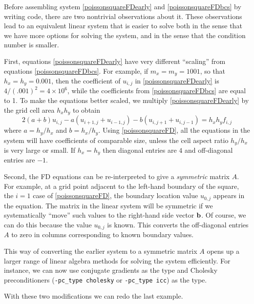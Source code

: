 \medskip
Before assembling system \eqref{poissonsquareFDearly} and \eqref{poissonsquareFDbcs} by writing \PETSc code, there are two nontrivial observations about it.  These observations lead to an equivalent linear system that is easier to solve both in the sense that we have more options for solving the system, and in the sense that the condition number is smaller.

First, equations \eqref{poissonsquareFDearly} have very different ``scaling'' from equations \eqref{poissonsquareFDbcs}.  For example, if $m_x=m_y=1001$, so that $h_x=h_y=0.001$, then the coefficient of $u_{i,j}$ in \eqref{poissonsquareFDearly} is $4/(.001)^2 = 4 \times 10^6$, while the coefficients from \eqref{poissonsquareFDbcs} are equal to 1.  To make the equations better scaled, we multiply \eqref{poissonsquareFDearly} by the grid cell area $h_x h_y$ to obtain
\begin{equation}
2 (a + b) u_{i,j} - a \left(u_{i+1,j} + u_{i-1,j}\right) - b \left(u_{i,j+1} + u_{i,j-1}\right) = h_x h_y f_{i,j} \label{poissonsquareFD}
\end{equation}
where $a=h_y/h_x$ and $b=h_x/h_y$.  Using \eqref{poissonsquareFD}, all the equations in the system will have coefficients of comparable size, unless the cell aspect ratio $h_y/h_x$ is very large or small.  If $h_x=h_y$ then diagonal entries are $4$ and off-diagonal entries are $-1$.

Second, the FD equations can be re-interpreted to give a \emph{symmetric} matrix $A$.  For example, at a grid point adjacent to the left-hand boundary of the square, the $i=1$ case of \eqref{poissonsquareFD}, the boundary location value $u_{0,j}$ appears in the equation.  The matrix in the linear system will be symmetric if we systematically ``move'' such values to the right-hand side vector $\mathbf{b}$.  Of course, we can do this because the value $u_{0,j}$ is known.  This converts the off-diagonal entries $A$ to zero in columns corresponding to known boundary values.

This way of converting the earlier system to a symmetric matrix $A$ opens up a larger range of linear algebra methods for solving the system efficiently.  For instance, we can now use conjugate gradients as the \pKSP type and Cholesky preconditioners (\texttt{-pc\_type cholesky} or \texttt{-pc\_type icc}) as the \pPC type.

With these two modifications we can redo the last example.


